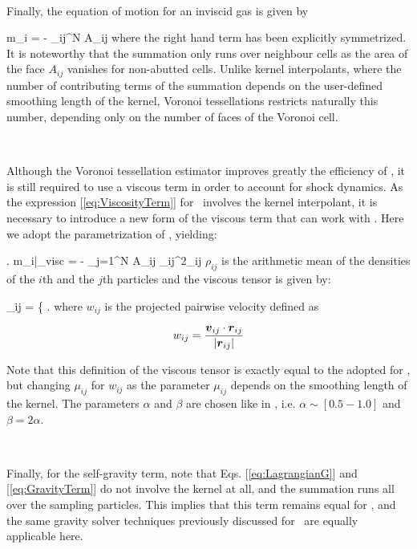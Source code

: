 \documentclass[a4,useAMS,usenatbib,usegraphicx,12pt]{article}
\begin{document}
\

Finally, the equation of motion for an inviscid gas is given by

{ m_i  = - \sum_{i\neq j}^N A_{ij} }
where the right hand term has been explicitly symmetrized. It is noteworthy that
the summation only runs over neighbour cells as the area of the face $A_{ij}$ 
vanishes for non-abutted cells. Unlike kernel interpolants, where the number of
contributing terms of the summation depends on the user-defined smoothing 
length of the kernel, Voronoi tessellations restricts naturally this number, 
depending only on the number of faces of the Voronoi cell.

\

Although the Voronoi tessellation estimator improves greatly the efficiency of 
\SPH, it is still required to use a viscous term in order to account for shock
dynamics. As the expression [\ref{eq:ViscosityTerm}] for \SPH\ involves the kernel
interpolant, it is necessary to introduce a new form of the viscous term that 
can work with \VPH. Here we adopt the parametrization of \citet{Hess10}, 
yielding:

{ \left. m_i\right|_{\mbox{\footnotesize visc}} =
- \sum_{j=1}^N A_{ij} {\rho}_{ij}^2\Pi_{ij} }
$\rho_{ij}$ is the arithmetic mean of the densities of the $i$th and the $j$th 
particles and the viscous tensor is given by:

{ \Pi_{ij} = \left\{ \right. }
where $w_{ij}$ is the projected pairwise velocity defined as

\[ w_{ij} = \frac{ \boldsymbol{ v }_{ij}\cdot \boldsymbol{ r }_{ij} }{|\boldsymbol{ r }_{ij}|} \]

Note that this definition of the viscous tensor is exactly equal to the adopted 
for \SPH, but changing $\mu_{ij}$ for $w_{ij}$ as the parameter $\mu_{ij}$ 
depends on the smoothing length of the kernel. The parameters $\alpha$ and 
$\beta$ are chosen like in \SPH, i.e. $\alpha \sim [0.5-1.0]$ and $\beta = 2\alpha$.

\

Finally, for the self-gravity term, note that Eqs. [\ref{eq:LagrangianG}] and 
[\ref{eq:GravityTerm}] do not involve the kernel at all, and the summation runs
all over the sampling particles. This implies that this term remains equal for 
\VPH, and the same gravity solver techniques previously discussed for \SPH\ are
equally applicable here.
\end{document}
